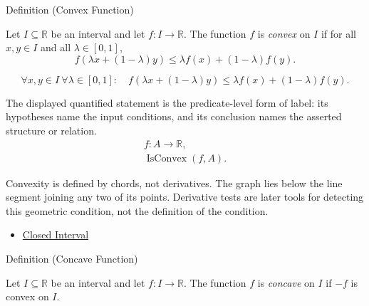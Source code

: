 

\begin{definitionbox}{Definition (Convex Function)}
\begin{definition}
\label{def:convex-function}
Let $I\subseteq\mathbb{R}$ be an interval and let $f:I\to\mathbb{R}$. The function $f$ is \emph{convex} on $I$ if for all $x,y\in I$ and all $\lambda\in[0,1]$,
\[
  f(\lambda x+(1-\lambda)y)
  \leq
  \lambda f(x)+(1-\lambda)f(y).
\]
\end{definition}
\end{definitionbox}

\begin{remark*}
\[
  \forall x,y\in I\ \forall\lambda\in[0,1]:\quad
  f(\lambda x+(1-\lambda)y)
  \leq
  \lambda f(x)+(1-\lambda)f(y).
\]
\end{remark*}

\begin{remark*}
The displayed quantified statement is the predicate-level form of label: its hypotheses name the input conditions, and its conclusion names the asserted structure or relation.
\[
\begin{aligned}
  f\colon A\to\mathbb{R},\\
  \operatorname{IsConvex}(f,A).
\end{aligned}
\]
\end{remark*}

\begin{remark*}[Interpretation]
Convexity is defined by chords, not derivatives. The graph lies below the line segment joining any two of its points. Derivative tests are later tools for detecting this geometric condition, not the definition of the condition.
\end{remark*}

\begin{dependencies}
\begin{itemize}
  \item \hyperref[def:closed-interval]{Closed Interval}
\end{itemize}
\end{dependencies}

\begin{definitionbox}{Definition (Concave Function)}
\begin{definition}
\label{def:concave-function}
Let $I\subseteq\mathbb{R}$ be an interval and let $f:I\to\mathbb{R}$. The function $f$ is \emph{concave} on $I$ if $-f$ is convex on $I$.
\end{definition}
\end{definitionbox}

